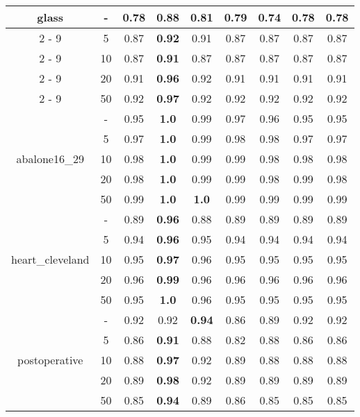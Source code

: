 \documentclass{article}%
\begin{document}
\begin{tabular}{c|c|ccccccc}
\hline%
\multirow{5}{*}{glass}&{-}&0.78&\textbf{0.88}&0.81&0.79&0.74&0.78&0.78\\%
\cline{2%
-%
9}%
&5&0.87&\textbf{0.92}&0.91&0.87&0.87&0.87&0.87\\%
\cline{2%
-%
9}%
&10&0.87&\textbf{0.91}&0.87&0.87&0.87&0.87&0.87\\%
\cline{2%
-%
9}%
&20&0.91&\textbf{0.96}&0.92&0.91&0.91&0.91&0.91\\%
\cline{2%
-%
9}%
&50&0.92&\textbf{0.97}&0.92&0.92&0.92&0.92&0.92\\%
\hline%
\multirow{5}{*}{abalone16\_29}&{-}&0.95&\textbf{1.0}&0.99&0.97&0.96&0.95&0.95\\%
\cline{2%
-%
9}%
&5&0.97&\textbf{1.0}&0.99&0.98&0.98&0.97&0.97\\%
\cline{2%
-%
9}%
&10&0.98&\textbf{1.0}&0.99&0.99&0.98&0.98&0.98\\%
\cline{2%
-%
9}%
&20&0.98&\textbf{1.0}&0.99&0.99&0.98&0.99&0.98\\%
\cline{2%
-%
9}%
&50&0.99&\textbf{1.0}&\textbf{1.0}&0.99&0.99&0.99&0.99\\%
\hline%
\multirow{5}{*}{heart\_cleveland}&{-}&0.89&\textbf{0.96}&0.88&0.89&0.89&0.89&0.89\\%
\cline{2%
-%
9}%
&5&0.94&\textbf{0.96}&0.95&0.94&0.94&0.94&0.94\\%
\cline{2%
-%
9}%
&10&0.95&\textbf{0.97}&0.96&0.95&0.95&0.95&0.95\\%
\cline{2%
-%
9}%
&20&0.96&\textbf{0.99}&0.96&0.96&0.96&0.96&0.96\\%
\cline{2%
-%
9}%
&50&0.95&\textbf{1.0}&0.96&0.95&0.95&0.95&0.95\\%
\hline%
\multirow{5}{*}{postoperative}&{-}&0.92&0.92&\textbf{0.94}&0.86&0.89&0.92&0.92\\%
\cline{2%
-%
9}%
&5&0.86&\textbf{0.91}&0.88&0.82&0.88&0.86&0.86\\%
\cline{2%
-%
9}%
&10&0.88&\textbf{0.97}&0.92&0.89&0.88&0.88&0.88\\%
\cline{2%
-%
9}%
&20&0.89&\textbf{0.98}&0.92&0.89&0.89&0.89&0.89\\%
\cline{2%
-%
9}%
&50&0.85&\textbf{0.94}&0.89&0.86&0.85&0.85&0.85\\%
\hline%
\end{tabular}

%
\end{document}
